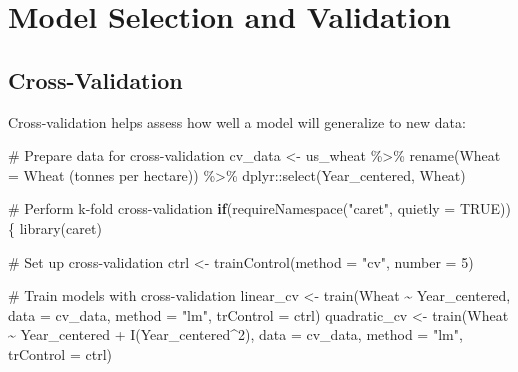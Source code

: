 \documentclass[
  letterpaper,
]{book}
\newenvironment{Shaded}{\begin{snugshade}}{\end{snugshade}}
\newcommand{\AttributeTok}[1]{\textcolor[rgb]{0.40,0.45,0.13}{#1}}
\newcommand{\CommentTok}[1]{\textcolor[rgb]{0.37,0.37,0.37}{#1}}
\newcommand{\ConstantTok}[1]{\textcolor[rgb]{0.56,0.35,0.01}{#1}}
\newcommand{\ControlFlowTok}[1]{\textcolor[rgb]{0.00,0.23,0.31}{\textbf{#1}}}
\newcommand{\DecValTok}[1]{\textcolor[rgb]{0.68,0.00,0.00}{#1}}
\newcommand{\FunctionTok}[1]{\textcolor[rgb]{0.28,0.35,0.67}{#1}}
\newcommand{\NormalTok}[1]{\textcolor[rgb]{0.00,0.23,0.31}{#1}}
\newcommand{\OtherTok}[1]{\textcolor[rgb]{0.00,0.23,0.31}{#1}}
\newcommand{\SpecialCharTok}[1]{\textcolor[rgb]{0.37,0.37,0.37}{#1}}
\newcommand{\StringTok}[1]{\textcolor[rgb]{0.13,0.47,0.30}{#1}}
\begin{document}
\section{Model Selection and
Validation}\label{model-selection-and-validation}

\subsection{Cross-Validation}\label{cross-validation}

Cross-validation helps assess how well a model will generalize to new
data:

\begin{Shaded}
\begin{Highlighting}[]
\CommentTok{\# Prepare data for cross{-}validation}
\NormalTok{cv\_data }\OtherTok{\textless{}{-}}\NormalTok{ us\_wheat }\SpecialCharTok{\%\textgreater{}\%}
  \FunctionTok{rename}\NormalTok{(}\AttributeTok{Wheat =} \StringTok{\textasciigrave{}}\AttributeTok{Wheat (tonnes per hectare)}\StringTok{\textasciigrave{}}\NormalTok{) }\SpecialCharTok{\%\textgreater{}\%}
\NormalTok{  dplyr}\SpecialCharTok{::}\FunctionTok{select}\NormalTok{(Year\_centered, Wheat)}

\CommentTok{\# Perform k{-}fold cross{-}validation}
\ControlFlowTok{if}\NormalTok{(}\FunctionTok{requireNamespace}\NormalTok{(}\StringTok{"caret"}\NormalTok{, }\AttributeTok{quietly =} \ConstantTok{TRUE}\NormalTok{)) \{}
  \FunctionTok{library}\NormalTok{(caret)}
  
  \CommentTok{\# Set up cross{-}validation}
\NormalTok{  ctrl }\OtherTok{\textless{}{-}} \FunctionTok{trainControl}\NormalTok{(}\AttributeTok{method =} \StringTok{"cv"}\NormalTok{, }\AttributeTok{number =} \DecValTok{5}\NormalTok{)}
  
  \CommentTok{\# Train models with cross{-}validation}
\NormalTok{  linear\_cv }\OtherTok{\textless{}{-}} \FunctionTok{train}\NormalTok{(Wheat }\SpecialCharTok{\textasciitilde{}}\NormalTok{ Year\_centered, }\AttributeTok{data =}\NormalTok{ cv\_data, }\AttributeTok{method =} \StringTok{"lm"}\NormalTok{,}
                    \AttributeTok{trControl =}\NormalTok{ ctrl)}
\NormalTok{  quadratic\_cv }\OtherTok{\textless{}{-}} \FunctionTok{train}\NormalTok{(Wheat }\SpecialCharTok{\textasciitilde{}}\NormalTok{ Year\_centered }\SpecialCharTok{+} \FunctionTok{I}\NormalTok{(Year\_centered}\SpecialCharTok{\^{}}\DecValTok{2}\NormalTok{), }\AttributeTok{data =}\NormalTok{ cv\_data, }
                       \AttributeTok{method =} \StringTok{"lm"}\NormalTok{, }\AttributeTok{trControl =}\NormalTok{ ctrl)}
  

\end{Highlighting}
\end{Shaded}
\end{document}

